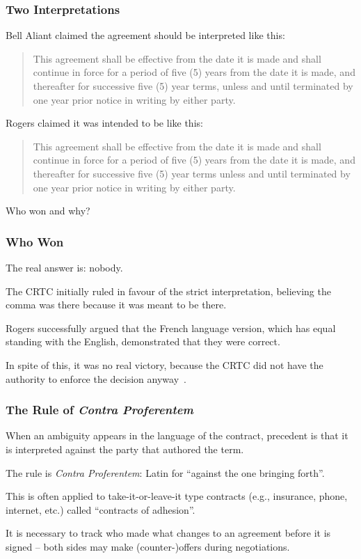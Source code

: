 \begin{frame}
\frametitle{Two Interpretations}

Bell Aliant claimed the agreement should be interpreted like this:
 
\begin{quote}
{\color{red} This agreement shall be effective from the date it is made and shall continue in force for a period of five (5) years from the date it is made}, and thereafter for successive five (5) year terms, {\color{red} unless and until terminated by one year prior notice in writing by either party.}
\end{quote}

Rogers claimed it was intended to be like this:

\begin{quote}
{\color{red}
This agreement shall be effective from the date it is made and shall continue in force for a period of five (5) years from the date it is made,} {\color{blue} and thereafter for successive five (5) year terms unless and until terminated by one year prior notice in writing by either party.}
\end{quote}

Who won and why?

\end{frame}



\begin{frame}
\frametitle{Who Won}

The real answer is: nobody. 

The CRTC initially ruled in favour of the strict interpretation, believing the comma was there because it was meant to be there.

Rogers successfully argued that the French language version, which has equal standing  with the English, demonstrated that they were correct.

In spite of this, it was no real victory, because the CRTC did not have the authority to enforce the decision anyway~\cite{comma}.

\end{frame}




\begin{frame}
\frametitle{The Rule of \textit{Contra Proferentem}}

When an ambiguity appears in the language of the contract, precedent is that it is interpreted against the party that authored the term.

The rule is \textit{Contra Proferentem}: Latin for ``against the one bringing forth''.

This is often applied to take-it-or-leave-it type contracts (e.g., insurance, phone, internet, etc.) called ``contracts of adhesion''.

It is necessary to track who made what changes to an agreement before it is signed -- both sides may make (counter-)offers during negotiations.
\end{frame}


